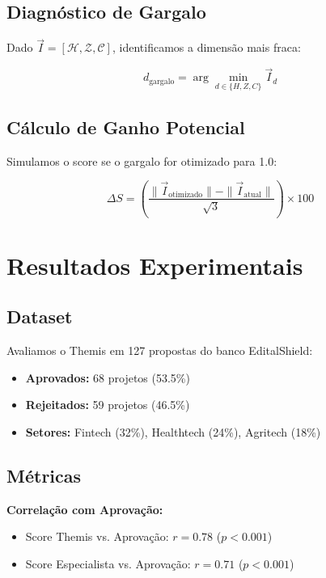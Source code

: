 \documentclass[12pt,a4paper]{article}
\begin{document}
\subsection{Diagnóstico de Gargalo}

Dado $\vec{I} = [\mathcal{H}, \mathcal{Z}, \mathcal{C}]$, identificamos a dimensão mais fraca:

\begin{equation}
d_{\text{gargalo}} = \arg\min_{d \in \{H, Z, C\}} \vec{I}_d
\end{equation}

\subsection{Cálculo de Ganho Potencial}

Simulamos o score se o gargalo for otimizado para 1.0:

\begin{equation}
\Delta S = \left( \frac{\|\vec{I}_{\text{otimizado}}\| - \|\vec{I}_{\text{atual}}\|}{\sqrt{3}} \right) \times 100
\end{equation}

\section{Resultados Experimentais}

\subsection{Dataset}

Avaliamos o Themis em 127 propostas do banco EditalShield:
\begin{itemize}
    \item \textbf{Aprovados:} 68 projetos (53.5\%)
    \item \textbf{Rejeitados:} 59 projetos (46.5\%)
    \item \textbf{Setores:} Fintech (32\%), Healthtech (24\%), Agritech (18\%)
\end{itemize}

\subsection{Métricas}

\textbf{Correlação com Aprovação:}
\begin{itemize}
    \item Score Themis vs. Aprovação: $r = 0.78$ ($p < 0.001$)
    \item Score Especialista vs. Aprovação: $r = 0.71$ ($p < 0.001$)
\end{itemize}
\end{document}

